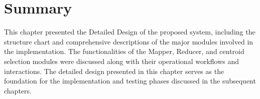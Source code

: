 
\section{Summary}

This chapter presented the Detailed Design of the proposed system, including the structure chart and comprehensive descriptions of the major modules involved in the implementation. The functionalities of the Mapper, Reducer, and centroid selection modules were discussed along with their operational workflows and interactions. The detailed design presented in this chapter serves as the foundation for the implementation and testing phases discussed in the subsequent chapters.
